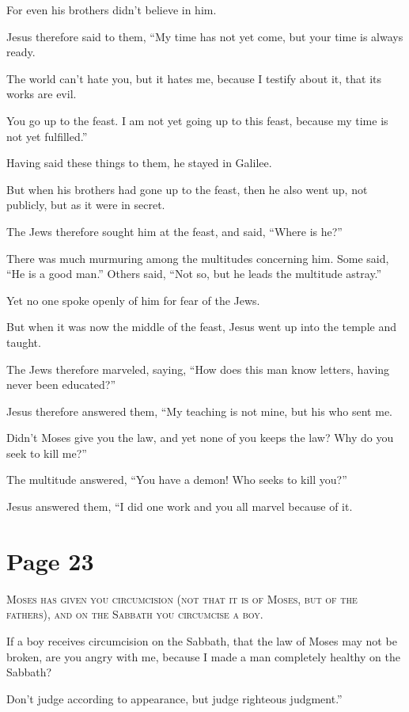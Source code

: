 For even his brothers didn’t believe in him.

Jesus therefore said to them, “My time has not yet come, but your time is always ready.

The world can’t hate you, but it hates me, because I testify about it, that its works are evil.

You go up to the feast. I am not yet going up to this feast, because my time is not yet fulfilled.”

Having said these things to them, he stayed in Galilee.

But when his brothers had gone up to the feast, then he also went up, not publicly, but as it were in secret.

The Jews therefore sought him at the feast, and said, “Where is he?”

There was much murmuring among the multitudes concerning him. Some said, “He is a good man.” Others said, “Not so, but he leads the multitude astray.”

Yet no one spoke openly of him for fear of the Jews.

But when it was now the middle of the feast, Jesus went up into the temple and taught.

The Jews therefore marveled, saying, “How does this man know letters, having never been educated?”

Jesus therefore answered them, “My teaching is not mine, but his who sent me.

Didn’t Moses give you the law, and yet none of you keeps the law? Why do you seek to kill me?”

The multitude answered, “You have a demon! Who seeks to kill you?”

Jesus answered them, “I did one work and you all marvel because of it.



\chapterornament
\section*{Page 23}

\lettrine{M}{oses has given you circumcision (not that it is of Moses, but of the fathers), and on the Sabbath you circumcise a boy.}

If a boy receives circumcision on the Sabbath, that the law of Moses may not be broken, are you angry with me, because I made a man completely healthy on the Sabbath?

Don’t judge according to appearance, but judge righteous judgment.”

